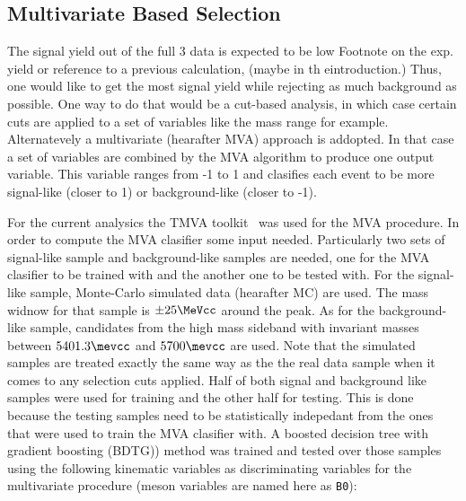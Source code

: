 

\subsection{Multivariate Based Selection}
\label{Multivariate_Based_Selection}

The \BsJpsiKst signal yield out of the full 3 \invfb data is expected to be low {\color{red} Footnote on the exp. yield or reference to a 
previous calculation, (maybe in th eintroduction.)} Thus, one would like to get the most signal yield while rejecting as much background
as possible. One way to do that would be a cut-based analysis, in which case certain cuts are applied to a set of variables like the \Bs 
mass range for example. Alternatevely a multivariate (hearafter MVA) approach is addopted. In that case a set of variables are 
combined by the MVA algorithm to produce one output variable. This variable ranges from -1 to 1 and clasifies each event to be more 
signal-like (closer to 1) or background-like (closer to -1).

For the current analysics the TMVA toolkit~\cite{TMVA} was used for the MVA procedure. In order to compute the MVA clasifier some input
needed. Particularly two sets of signal-like sample and background-like samples are needed, one for the MVA clasifier to be trained with
and the another one to be tested with. For the signal-like sample, \BsJpsiKst Monte-Carlo simulated data (hearafter MC) are used. The \Bs 
mass widnow for that sample is $\pm 25 \MeVcc$ around the \Bs peak. As for the background-like sample, candidates from the high mass sideband
with invariant masses between $5401.3\mevcc$ and $5700\mevcc$ are used. Note that the simulated samples are treated exactly the same way as the
the real data sample when it comes to any selection cuts applied. Half of both signal and background like samples were used for training and the
other half for testing. This is done because the testing samples need to be statistically indepedant from the ones that were used to train the 
MVA clasifier with. A boosted decision tree with gradient boosting (BDTG){\color{red}{what is gradiaent boosting})} method was trained and tested
over those samples using the following kinematic variables as discriminating variables for the multivariate procedure (\Bs meson variables are 
named here as \texttt{B0}):

